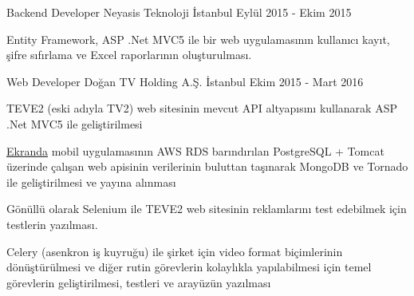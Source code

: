 
\begin{cventries}

    \cventry
        {Backend Developer}
        {Neyasis Teknoloji}
        {İstanbul}
        {Eylül 2015 - Ekim 2015}
        {
        \begin{cvitems}
            \item{Entity Framework, ASP .Net MVC5 ile bir web uygulamasının kullanıcı kayıt, şifre sıfırlama ve Excel raporlarının oluşturulması. }
        \end{cvitems}
        }
        
        \cventry
        {Web Developer}
        {Doğan TV Holding A.Ş.}
        {İstanbul}
        {Ekim 2015 - Mart 2016}
        {
            \begin{cvitems}
                \item{TEVE2 (eski adıyla TV2) web sitesinin mevcut API altyapısını kullanarak ASP .Net MVC5 ile geliştirilmesi}
                \item {\href{https://play.google.com/store/apps/details?id=dogantv.ekranda}{Ekranda} }
                { mobil uygulamasının AWS RDS barındırılan PostgreSQL + Tomcat üzerinde çalışan web apisinin verilerinin buluttan taşınarak MongoDB ve Tornado ile geliştirilmesi ve yayına alınması}
                \item {Gönüllü olarak Selenium ile TEVE2 web sitesinin reklamlarını test edebilmek için testlerin yazılması.}
                \item {Celery (asenkron iş kuyruğu) ile şirket için video format biçimlerinin dönüştürülmesi ve diğer rutin görevlerin kolaylıkla yapılabilmesi için temel görevlerin geliştirilmesi, testleri ve arayüzün yazılması}
            \end{cvitems}
        }
        

\end{cventries}

